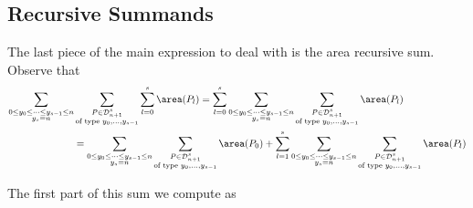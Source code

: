 \documentclass[12pt]{article}
\begin{document}
\subsection{Recursive Summands}
The last piece of the main expression to deal with is the area recursive sum. Observe that
\begin{align*}
    \sum_{\substack{0\leq y_{0}\leq \cdots\leq y_{s-1}\leq n\\y_{s}=n}} &\sum_{\substack{P\in \mathcal{D}_{n+1}^{s}\\\text{of type }y_{0},\ldots, y_{s-1}}}  \sum_{l=0}^{s}\area(P_{l}) = \sum_{l=0}^{s} \sum_{\substack{0\leq y_{0}\leq \cdots\leq y_{s-1}\leq n\\y_{s}=n}} \sum_{\substack{P\in \mathcal{D}_{n+1}^{s}\\\text{of type }y_{0},\ldots, y_{s-1}}} \area(P_{l}) \\
    &= \sum_{\substack{0\leq y_{0}\leq \cdots\leq y_{s-1}\leq n\\y_{s}=n}} \sum_{\substack{P\in \mathcal{D}_{n+1}^{s}\\\text{of type }y_{0},\ldots, y_{s-1}}} \area(P_{0}) +\sum_{l=1}^{s} \sum_{\substack{0\leq y_{0}\leq \cdots\leq y_{s-1}\leq n\\y_{s}=n}} \sum_{\substack{P\in \mathcal{D}_{n+1}^{s}\\\text{of type }y_{0},\ldots, y_{s-1}}} \area(P_{l}) \\
\end{align*}

The first part of this sum we compute as 
\end{document}
